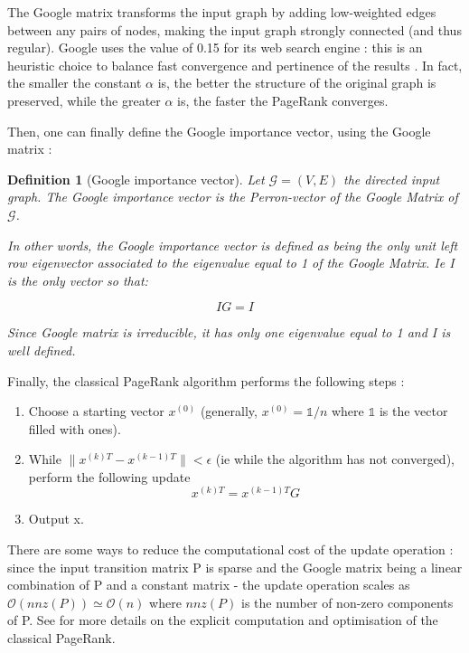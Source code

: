 \documentclass{article}
\newtheorem{definition}{Definition}[section]
\begin{document}
The Google matrix transforms the input graph by adding low-weighted edges between any pairs of nodes, making the input graph strongly connected (and thus regular). Google uses the value of 0.15 for its web search engine : this is an heuristic choice to balance fast convergence and pertinence of the results \cite{langville_meyer_2004}. In fact, the smaller the constant $\alpha$ is, the better the structure of the original graph is preserved, while the greater $\alpha$ is, the faster the PageRank converges.

Then, one can finally define the Google importance vector, using the Google matrix :
 
\begin{definition}[Google importance vector]
Let $\mathcal{G}=(V,E)$ the directed input graph. The Google importance vector is the Perron-vector of the Google Matrix of $\mathcal{G}$.

In other words, the Google importance vector is defined as being the only unit left row eigenvector associated to the eigenvalue equal to 1 of the Google Matrix. Ie I is the only vector so that:

\begin{equation}
    IG = I
\end{equation}

Since Google matrix is irreducible, it has only one eigenvalue equal to 1 and I is well defined.\\

\end{definition}

Finally, the classical PageRank algorithm performs the following steps : 

\begin{enumerate}
    \item Choose a starting vector $x^{(0)}$ (generally, $x^{(0)} = \mathbb{1}/n$ where $\mathbb{1}$ is the vector filled with ones).
    \item While $\|x^{(k)T} - x^{(k-1)T}\| < \epsilon$ (ie while the algorithm has not converged), perform the following update 
    \begin{equation*}
        x^{(k)T} = x^{(k-1)T} G
    \end{equation*}
    \item Output x.
    
\end{enumerate}

There are some ways to reduce the computational cost of the update operation : since the input transition matrix P is sparse and the Google matrix being a linear combination of P and a constant matrix - the update operation scales as $\mathcal{O}(nnz(P)) \simeq \mathcal{O} (n)$ where $nnz(P)$ is the number of non-zero components of P. See \cite{langville_meyer_2004} for more details on the explicit computation and optimisation of the classical PageRank.
\end{document}
